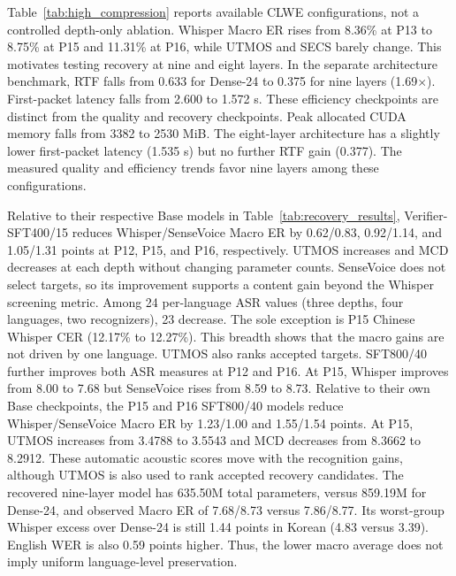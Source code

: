 \documentclass{article}
\begin{document}
Table~\ref{tab:high_compression} reports available CLWE configurations,
not a controlled depth-only ablation. Whisper Macro ER rises from
8.36\% at P13 to 8.75\% at P15 and 11.31\% at P16, while UTMOS and
SECS barely change. This motivates testing recovery at nine and eight
layers. In the separate architecture benchmark, RTF falls from 0.633
for Dense-24 to 0.375 for nine layers (1.69$\times$). First-packet
latency falls from 2.600 to 1.572 s. These efficiency checkpoints
are distinct from the quality and recovery checkpoints. Peak allocated
CUDA memory falls from 3382 to 2530 MiB. The eight-layer architecture
has a slightly lower first-packet latency (1.535 s) but no further RTF
gain (0.377). The measured quality and efficiency trends favor nine
layers among these configurations.

Relative to their respective Base models in
Table~\ref{tab:recovery_results}, Verifier-SFT400/15 reduces
Whisper/SenseVoice Macro ER by 0.62/0.83, 0.92/1.14, and 1.05/1.31
points at P12, P15, and P16, respectively. UTMOS increases and MCD
decreases at each depth without changing parameter counts. SenseVoice
does not select targets, so its improvement supports a content gain
beyond the Whisper screening metric. Among 24 per-language ASR values
(three depths, four languages, two recognizers), 23 decrease. The sole
exception is P15 Chinese Whisper CER (12.17\% to 12.27\%). This breadth
shows that the macro gains are not driven by one language. UTMOS also
ranks accepted targets.
SFT800/40 further improves both ASR measures at P12 and P16. At P15,
Whisper improves from 8.00 to 7.68 but SenseVoice rises from 8.59 to
8.73. Relative to their own Base checkpoints, the P15 and P16
SFT800/40 models reduce Whisper/SenseVoice Macro ER by 1.23/1.00 and
1.55/1.54 points. At P15, UTMOS increases from 3.4788 to 3.5543 and
MCD decreases from 8.3662 to 8.2912. These automatic acoustic scores
move with the recognition gains, although UTMOS is also used to rank
accepted recovery candidates.
The recovered nine-layer model has 635.50M total parameters,
versus 859.19M for Dense-24, and observed Macro ER of 7.68/8.73
versus 7.86/8.77. Its worst-group Whisper excess over Dense-24 is
still 1.44 points in Korean (4.83 versus 3.39). English WER is also
0.59 points higher. Thus, the lower macro average does not imply
uniform language-level preservation.
\end{document}
